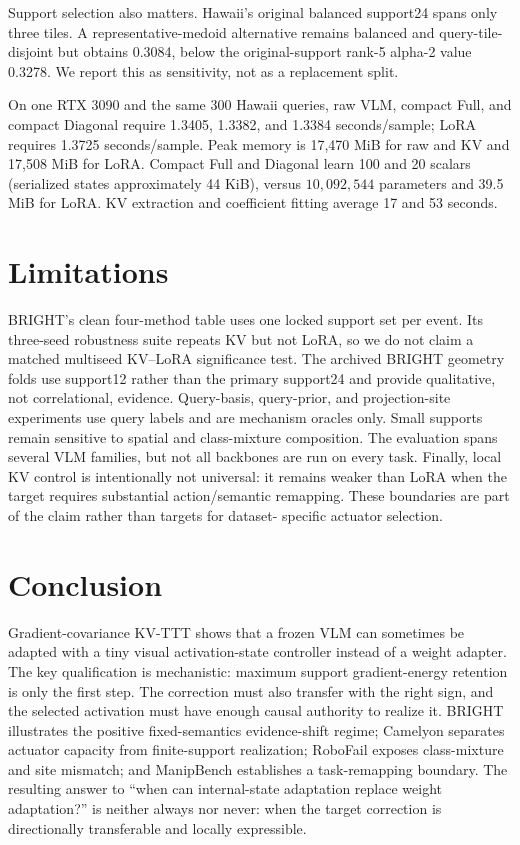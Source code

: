 \documentclass[conference]{IEEEtran}
\newcommand{\KVTTT}{\textsc{KV-TTT}}
\begin{document}
Support selection also matters. Hawaii's original balanced support24 spans
only three tiles. A representative-medoid alternative remains balanced and
query-tile-disjoint but obtains 0.3084, below the original-support rank-5
alpha-2 value 0.3278. We report this as sensitivity, not as a replacement split.

On one RTX 3090 and the same 300 Hawaii queries, raw VLM, compact Full, and
compact Diagonal require 1.3405, 1.3382, and 1.3384 seconds/sample; LoRA requires
1.3725 seconds/sample. Peak memory is 17,470 MiB for raw and KV and 17,508 MiB
for LoRA. Compact Full and Diagonal learn 100 and 20 scalars (serialized states
approximately 44 KiB), versus $10{,}092{,}544$ parameters and 39.5 MiB for
LoRA. KV extraction and coefficient fitting average 17 and 53 seconds.

\section{Limitations}
BRIGHT's clean four-method table uses one locked support set per event.  Its
three-seed robustness suite repeats KV but not LoRA, so we do not claim a
matched multiseed KV--LoRA significance test.  The archived BRIGHT geometry
folds use support12 rather than the primary support24 and provide qualitative,
not correlational, evidence.  Query-basis, query-prior, and projection-site
experiments use query labels and are mechanism oracles only.  Small supports
remain sensitive to spatial and class-mixture composition.  The evaluation
spans several VLM families, but not all backbones are run on every task.
Finally, local KV control is intentionally not universal: it remains weaker
than LoRA when the target requires substantial action/semantic remapping.
These boundaries are part of the claim rather than targets for dataset-
specific actuator selection.

\section{Conclusion}
Gradient-covariance \KVTTT{} shows that a frozen VLM can sometimes be adapted
with a tiny visual activation-state controller instead of a weight adapter.
The key qualification is mechanistic: maximum support gradient-energy
retention is only the first step.  The correction must also transfer with the
right sign, and the selected activation must have enough causal authority to
realize it.  BRIGHT illustrates the positive fixed-semantics evidence-shift
regime; Camelyon separates actuator capacity from finite-support realization;
RoboFail exposes class-mixture and site mismatch; and ManipBench establishes a
task-remapping boundary.  The resulting answer to ``when can internal-state
adaptation replace weight adaptation?'' is neither always nor never: when the
target correction is directionally transferable and locally expressible.
\end{document}
